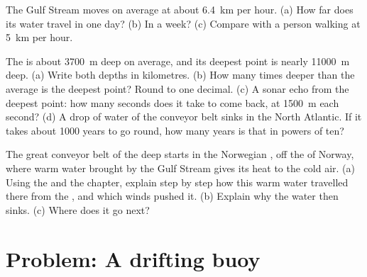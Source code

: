 \begin{exercise}[$\star\star$]\label{exo:g8:the-oceans:10}
The Gulf Stream moves on average at about \qty{6.4}{km} per hour. (a) How
far does its water travel in one day? (b) In a week? (c) Compare with a
person walking at \qty{5}{km} per hour.
\end{exercise}

\begin{exercise}[$\star\star\star$]\label{exo:g8:the-oceans:11}
The  is about \qty{3700}{m} deep on average, and its deepest point is
nearly \qty{11000}{m} deep. (a) Write both depths in kilometres. (b) How
many times deeper than the average is the deepest point? Round to one
decimal. (c) A sonar echo from the deepest point: how many seconds does
it take to come back, at \qty{1500}{m} each second? (d) A drop of water
of the conveyor belt sinks in the North Atlantic. If it takes about
\num{1000} years to go round, how many years is that in powers of ten?
\end{exercise}

\begin{exercise}[$\star\star\star$]\label{exo:g8:the-oceans:12}
The great conveyor belt of the deep  starts in the Norwegian ,
off the  of Norway, where warm water brought by the Gulf Stream gives
its heat to the cold air. (a) Using the   and the chapter, explain
step by step how this warm water travelled there from the , and
which winds pushed it. (b) Explain why the water then sinks. (c) Where
does it go next?
\end{exercise}

\section{Problem: A drifting buoy}

